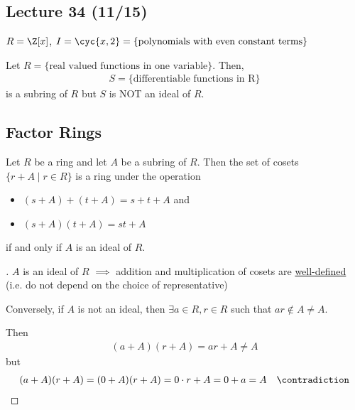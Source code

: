
\subsection*{Lecture 34 (11/15)} %

\begin{example}
  \( R = \Z[x] \), \( I=\cyc{x,2}=\{\text{polynomials with even constant terms}\} \)
\end{example}

\begin{nonexample}
  Let \( R=\{\text{real valued functions in one variable}\} \). Then,
  \begin{align*}
    S=\{\text{differentiable functions in R}\}
  \end{align*}
  is a subring of \( R \) but \( S \) is NOT an ideal of \( R \).
\end{nonexample}

\subsection{Factor Rings}

\begin{theorem}
  Let \( R \) be a ring and let \( A \) be a subring of \( R \). Then the set of cosets \( \{r+A\mid r\in R\} \)  is a ring under the operation
  \begin{itemize}
    \item \( (s+A)+(t+A) = s+t+A \) and
    \item \( (s+A)(t+A) = st+A\)
  \end{itemize}
  if and only if \( A \) is an ideal of \( R \).
\end{theorem}

\begin{proof}[]
  \( A \) is an ideal of \( R \) \( \implies \) addition and multiplication of cosets are \uline{well-defined} (i.e. do not depend on the choice of representative)

  Conversely, if \( A \) is not an ideal, then \( \exists a\in R, r\in R \) such that \( ar\not\in A \neq A \).

  Then
  \begin{align*}
    (a+A)(r+A) = ar+A\neq A
  \end{align*}
  but
  \begin{align*}
    (a+A)(r+A)=(0+A)(r+A) =0\cdot r+A=0+a=A \quad \contradiction
  \end{align*}
\end{proof}

